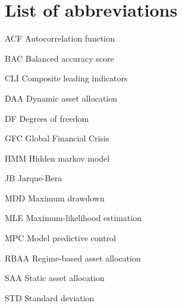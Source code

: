 \section*{List of abbreviations}

\begin{abbrv}
\item[ACF] Autocorrelation function
\item[BAC] Balanced accuracy score
\item[CLI] Composite leading indicators
\item[DAA] Dynamic asset allocation
\item[DF] Degrees of freedom
\item[GFC] Global Financial Crisis
\item[HMM] Hidden markov model
\item[JB] Jarque-Bera
\item[MDD] Maximum drawdown
\item[MLE] Maximum-likelihood estimation
\item[MPC] Model predictive control
\item[RBAA] Regime-based asset allocation
\item[SAA] Static asset allocation
\item[STD] Standard deviation
\
\end{abbrv}
